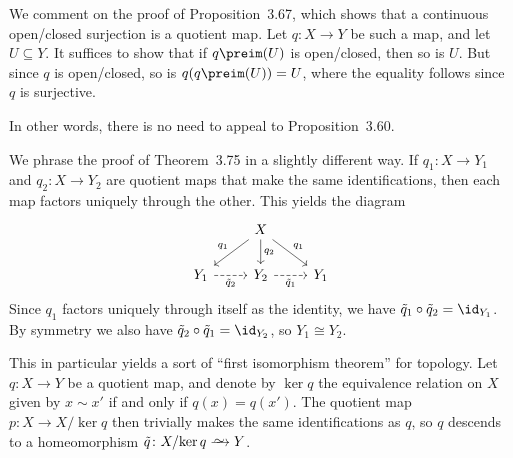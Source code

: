 \documentclass[article, a4paper, 11pt, oneside]{memoir}
\numberwithin{equation}{chapter}
\theoremstyle{nonumberplain}
\begin{document}
\begin{remark}
    We comment on the proof of Proposition~3.67, which shows that a continuous open/closed surjection is a quotient map. Let $q \colon X \to Y$ be such a map, and let $U \subseteq Y$. It suffices to show that if $q\preim(U)$ is open/closed, then so is $U$. But since $q$ is open/closed, so is $q(q\preim(U)) = U$, where the equality follows since $q$ is surjective.

    In other words, there is no need to appeal to Proposition~3.60.
\end{remark}

\newcommand{\congto}{\xrightarrow{\raisebox{-1ex}[0ex][0ex]{$\sim$}}}

\begin{remarkbreak}
    We phrase the proof of Theorem~3.75 in a slightly different way. If $q_1 \colon X \to Y_1$ and $q_2 \colon X \to Y_2$ are quotient maps that make the same identifications, then each map factors uniquely through the other. This yields the diagram
    \begin{equation*}
        \begin{tikzcd}
            & X
                \ar[dl, "q_1", swap]
                \ar[d, "q_2"]
                \ar[dr, "q_1"] \\
            Y_1
                \ar[r, dashed, "\tilde{q}_2", swap]
            & Y_2
                \ar[r, dashed, "\tilde{q}_1", swap]
            & Y_1
        \end{tikzcd}
    \end{equation*}
    Since $q_1$ factors uniquely through itself as the identity, we have $\tilde{q}_1 \circ \tilde{q}_2 = \id_{Y_1}$. By symmetry we also have $\tilde{q}_2 \circ \tilde{q}_1 = \id_{Y_2}$, so $Y_1 \cong Y_2$.

    This in particular yields a sort of \enquote{first isomorphism theorem} for topology. Let $q \colon X \to Y$ be a quotient map, and denote by $\ker q$ the equivalence relation on $X$ given by $x \sim x'$ if and only if $q(x) = q(x')$. The quotient map $p \colon X \to X/{\ker q}$ then trivially makes the same identifications as $q$, so $q$ descends to a homeomorphism $\tilde{q} \colon X/{\ker q} \congto Y$.
    

\end{remarkbreak}
\end{document}

